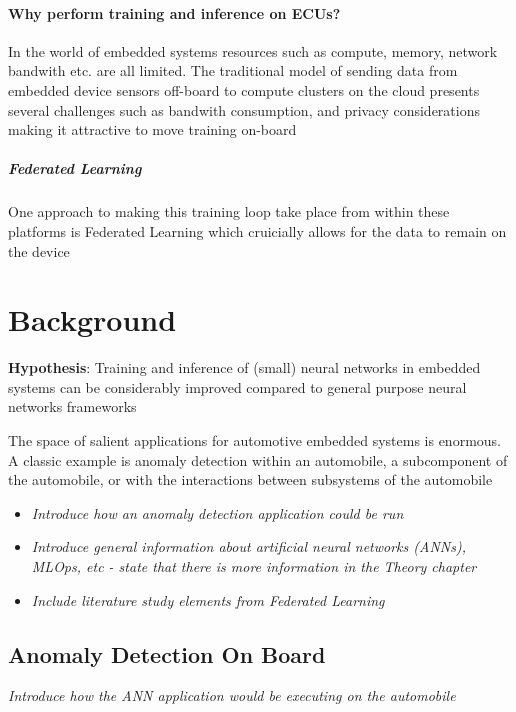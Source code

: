\subsubsection{Why perform training and inference on ECUs?}

In the world of embedded systems resources such as compute, memory, network bandwith etc. are all limited. The traditional model of sending data from embedded device sensors off-board to compute clusters on the cloud presents several challenges such as bandwith consumption, and privacy considerations making it attractive to move training on-board

\paragraph{Federated Learning}{
	One approach to making this training loop take place from within these platforms is Federated Learning which cruicially allows for the data to remain on the device
}

\chapter{Background}

\noindent \textbf{Hypothesis}: Training and inference of (small) neural networks in embedded systems can be considerably improved compared to general purpose neural networks frameworks

The space of salient applications for automotive embedded systems is enormous. A classic example is anomaly detection within an automobile, a subcomponent of the automobile, or with the interactions between subsystems of the automobile

\begin{itemize}
	\item \textit{Introduce how an anomaly detection application could be run}
	\item \textit{Introduce general information about artificial neural networks (ANNs), MLOps, etc - state that there is more information in the Theory chapter}
	\item \textit{Include literature study elements from Federated Learning}
\end{itemize}

\section[Anomaly Detection using Machine Learning]{Anomaly Detection On Board}
\textit{Introduce how the ANN application would be executing on the automobile}

